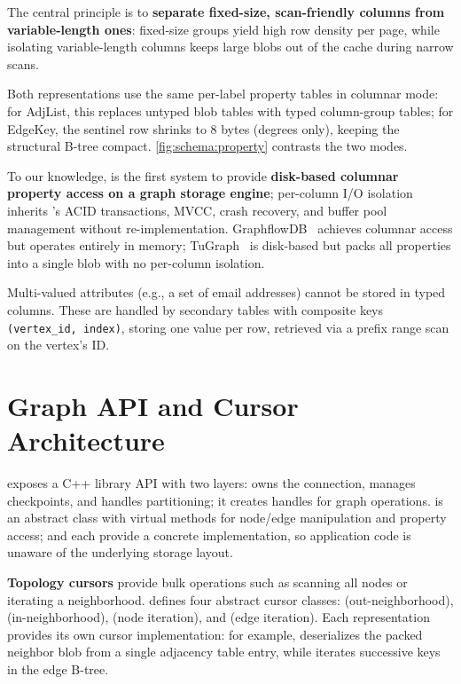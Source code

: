 The central principle is to \textbf{separate fixed-size, scan-friendly columns from variable-length ones}: fixed-size groups yield high row density per page, while isolating variable-length columns keeps large blobs out of the cache during narrow scans.

Both representations use the same per-label property tables in columnar mode: for AdjList, this replaces untyped blob tables with typed column-group tables; for EdgeKey, the sentinel row shrinks to 8 bytes (degrees only), keeping the structural B-tree compact.
\autoref{fig:schema:property} contrasts the two modes.

To our knowledge, \project{}is the first system to provide \textbf{disk-based columnar property access on a graph storage engine}; per-column I/O isolation inherits \wt{}'s ACID transactions, MVCC, crash recovery, and buffer pool management without re-implementation.
GraphflowDB~\cite{graphflowdb2021Gupta} achieves columnar access but operates entirely in memory; TuGraph~\cite{linBuildingHighPerformanceGraph2024} is disk-based but packs all properties into a single blob with no per-column isolation.

Multi-valued attributes (e.g., a set of email addresses) cannot be stored in typed columns.
These are handled by secondary tables with composite keys \texttt{(vertex\_id, index)}, storing one value per row, retrieved via a prefix range scan on the vertex's ID.

% 

\section{Graph API and Cursor Architecture}
\label{arch:api}

\project{} exposes a C++ library API with two layers:  owns the \wt{} connection, manages checkpoints, and handles partitioning; it creates  handles for graph operations.
 is an abstract class with virtual methods for node/edge manipulation and property access;  and  each provide a concrete implementation, so application code is unaware of the underlying storage layout.

\textbf{Topology cursors} provide bulk operations such as scanning all nodes or iterating a neighborhood.
\project{} defines four abstract cursor classes:  (out-neighborhood),  (in-neighborhood),  (node iteration), and  (edge iteration).
Each representation provides its own cursor implementation: for example,  deserializes the packed neighbor blob from a single adjacency table entry, while  iterates successive keys in the edge B-tree.

